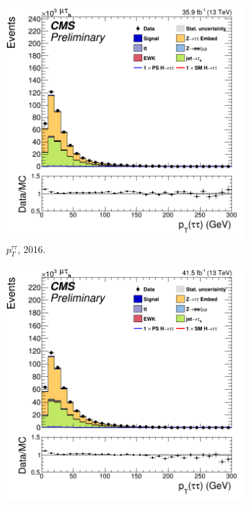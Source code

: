 \begin{figure}
    \begin{subfigure}[b]{0.33\linewidth}
    \centering
    \includegraphics[width=\linewidth]{Chapitre7/Images/CtrlPlots/2016/DitaupT.png} 
    \caption{$p^{\tau\tau}_T$, 2016.} 
    \vspace{0.5ex}
  \end{subfigure}%
  \begin{subfigure}[b]{0.33\linewidth}
    \centering
    \includegraphics[width=\linewidth]{Chapitre7/Images/CtrlPlots/2017/DitaupT.png} 

\end{subfigure}
\end{figure}
